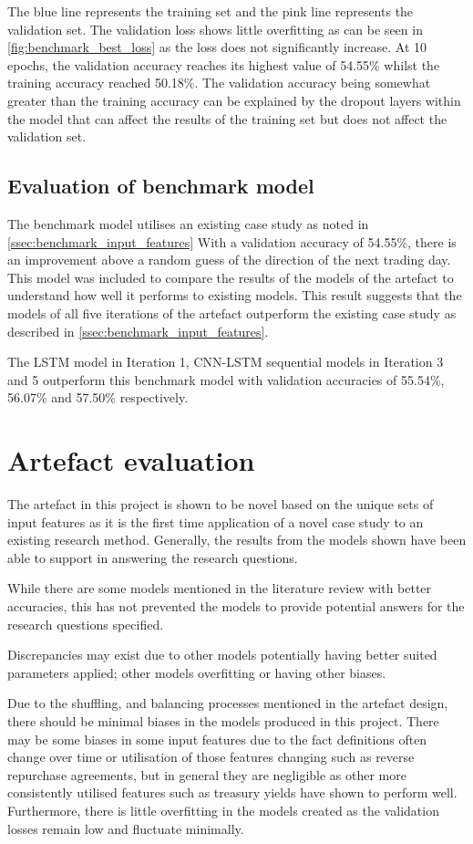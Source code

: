 The blue line represents the training set and the pink line represents
the validation set. The validation loss shows little overfitting as can be seen in
\autoref{fig:benchmark_best_loss} as the loss does not significantly increase. At 10 epochs,
the validation accuracy reaches its highest value of 54.55\% whilst the training accuracy reached 50.18\%. The validation accuracy being somewhat greater than the
training accuracy can be explained by the dropout layers within the model that can affect the results of the training
set but does not affect the validation set.


\subsection{Evaluation of benchmark model}
The benchmark model utilises an existing case study as noted in \autoref{ssec:benchmark_input_features}
With a validation accuracy of 54.55\%, there is an improvement above a random guess of the direction
of the next trading day. This model was included to compare the results of the models of the artefact to understand
how well it performs to existing models.  This result suggests that the models of all five iterations of the artefact
outperform the existing case study as described in \autoref{ssec:benchmark_input_features}.

The LSTM model in Iteration 1, CNN-LSTM sequential models in Iteration 3 and 5 outperform this benchmark model
with validation accuracies of 55.54\%, 56.07\% and 57.50\% respectively.


\section{Artefact evaluation}
The artefact in this project is shown to be novel based on the unique sets of input features as
it is the first time application of a novel case study to an existing research method. Generally,
the results from the models shown have been able to support in answering the research questions.

While there are some models mentioned in the literature review with better accuracies, this has not
prevented the models to provide potential answers for the research questions specified.

Discrepancies may exist due to other models potentially having better suited parameters applied;
other models overfitting or having other biases.

Due to the shuffling, and balancing processes mentioned in the artefact design, there should be minimal
biases in the models produced in this project. There may be some biases in some input features due to the
fact definitions often change over time or utilisation of those features changing such as reverse repurchase
agreements, but in general they are negligible as other more consistently utilised features such as treasury
yields have shown to perform well. Furthermore, there is little overfitting in the models created
as the validation losses remain low and fluctuate minimally.

